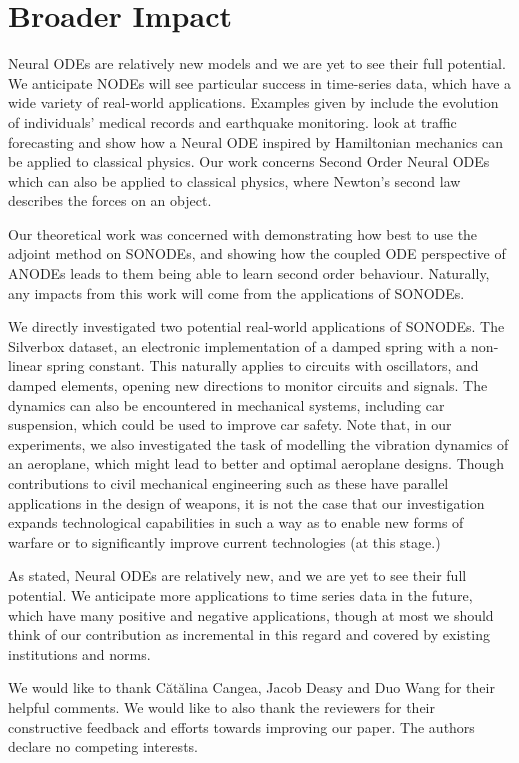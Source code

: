 \documentclass{article}
\theoremstyle{remark}
\theoremstyle{definition}
\begin{document}
\section*{Broader Impact}
Neural ODEs are relatively new models and we are yet to see their full potential. We anticipate NODEs will see particular success in time-series data, which have a wide variety of real-world applications. Examples given by \citet{jia2019neural} include the evolution of individuals' medical records and earthquake monitoring. \citet{poli2019graph} look at traffic forecasting and \citet{greydanus2019hamiltonian} show how a Neural ODE inspired by Hamiltonian mechanics can be applied to classical physics. Our work concerns Second Order Neural ODEs which can also be applied to classical physics, where Newton's second law describes the forces on an object. 

Our theoretical work was concerned with demonstrating how best to use the adjoint method on SONODEs, and showing how the coupled ODE perspective of ANODEs leads to them being able to learn second order behaviour. Naturally, any impacts from this work will come from the applications of SONODEs.

We directly investigated two potential real-world applications of SONODEs. The Silverbox dataset, an electronic implementation of a damped spring with a non-linear spring constant. This naturally applies to circuits with oscillators, and damped elements, opening new directions to monitor circuits and signals. The dynamics can also be encountered in mechanical systems, including car suspension, which could be used to improve car safety. Note that, in our experiments, we also investigated the task of modelling the vibration dynamics of an aeroplane, which might lead to better and optimal aeroplane designs. Though contributions to civil mechanical engineering such as these have parallel applications in the design of weapons, it is not the case that our investigation expands technological capabilities in such a way as to enable new forms of warfare or to significantly improve current technologies (at this stage.)

As stated, Neural ODEs are relatively new, and we are yet to see their full potential. We anticipate more applications to time series data in the future, which have many positive and negative applications, though at most we should think of our contribution as incremental in this regard and covered by existing institutions and norms.

\begin{ack}



We would like to thank C\u{a}t\u{a}lina Cangea, Jacob Deasy and Duo Wang for their helpful comments. We would like to also thank the reviewers for their constructive feedback and efforts towards improving our paper. The authors declare no competing interests.

\end{ack}
\end{document}

